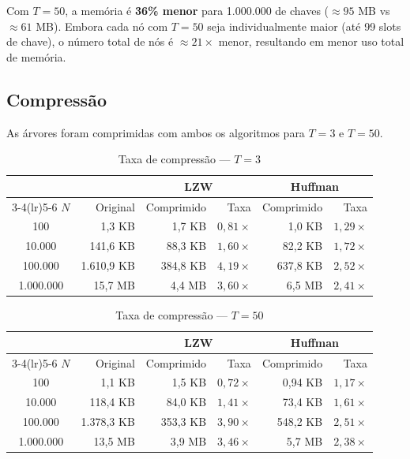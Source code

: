 \documentclass{ifpr-pinhais}
\begin{document}
Com $T = 50$, a memória é \textbf{36\% menor} para 1.000.000 de chaves ($\approx 95$ MB vs $\approx 61$ MB). Embora cada nó com $T = 50$ seja individualmente maior (até 99 slots de chave), o número total de nós é $\approx 21\times$ menor, resultando em menor uso total de memória.

\subsection{Compressão}

As árvores foram comprimidas com ambos os algoritmos para $T = 3$ e $T = 50$.

\begin{table}[H]
\centering
\caption{Taxa de compressão — $T = 3$}
\label{tab:compress_t3}
\begin{tabular}{c r rr rr}
\toprule
 & & \multicolumn{2}{c}{LZW} & \multicolumn{2}{c}{Huffman} \\
\cmidrule(lr){3-4}\cmidrule(lr){5-6}
$N$ & Original & Comprimido & Taxa & Comprimido & Taxa \\
\midrule
100        &  1,3 KB    &  1,7 KB    & $0{,}81\times$ &  1,0 KB    & $1{,}29\times$ \\
10.000     &  141,6 KB  &  88,3 KB   & $1{,}60\times$ &  82,2 KB   & $1{,}72\times$ \\
100.000    & 1.610,9 KB & 384,8 KB   & $4{,}19\times$ & 637,8 KB   & $2{,}52\times$ \\
1.000.000  & 15,7 MB    &  4,4 MB    & $3{,}60\times$ &  6,5 MB    & $2{,}41\times$ \\
\bottomrule
\end{tabular}
\end{table}

\begin{table}[H]
\centering
\caption{Taxa de compressão — $T = 50$}
\label{tab:compress_t50}
\begin{tabular}{c r rr rr}
\toprule
 & & \multicolumn{2}{c}{LZW} & \multicolumn{2}{c}{Huffman} \\
\cmidrule(lr){3-4}\cmidrule(lr){5-6}
$N$ & Original & Comprimido & Taxa & Comprimido & Taxa \\
\midrule
100        &  1,1 KB    &  1,5 KB    & $0{,}72\times$ &  0,94 KB   & $1{,}17\times$ \\
10.000     &  118,4 KB  &  84,0 KB   & $1{,}41\times$ &  73,4 KB   & $1{,}61\times$ \\
100.000    & 1.378,3 KB & 353,3 KB   & $3{,}90\times$ & 548,2 KB   & $2{,}51\times$ \\
1.000.000  & 13,5 MB    &  3,9 MB    & $3{,}46\times$ &  5,7 MB    & $2{,}38\times$ \\
\bottomrule
\end{tabular}
\end{table}
\end{document}
